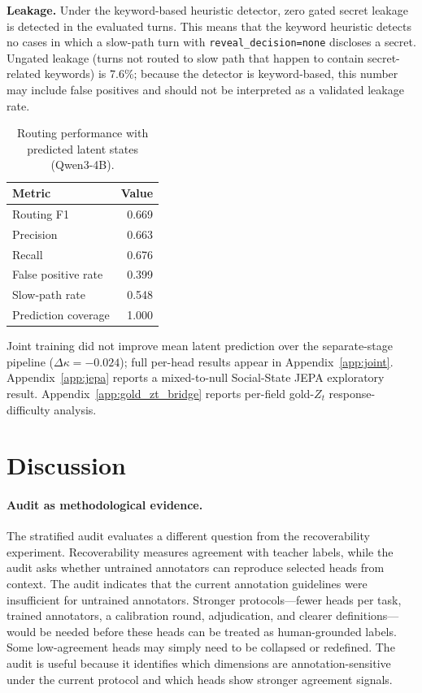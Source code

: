 \documentclass[11pt]{article}
\begin{document}
\textbf{Leakage.} Under the keyword-based heuristic detector, zero gated secret leakage is detected in the evaluated turns.
This means that the keyword heuristic detects no cases in which a slow-path turn with \texttt{reveal\_decision=none} discloses a secret.
Ungated leakage (turns not routed to slow path that happen to contain secret-related keywords) is 7.6\%; because the detector is keyword-based, this number may include false positives and should not be interpreted as a validated leakage rate.

\begin{table}[t]
\centering
\caption{Routing performance with predicted latent states (Qwen3-4B).}
\label{tab:routing}
\small
\begin{tabularx}{\linewidth}{@{}Xr@{}}
\toprule
\textbf{Metric} & \textbf{Value} \\
\midrule
Routing F1 & 0.669 \\
Precision & 0.663 \\
Recall & 0.676 \\
False positive rate & 0.399 \\
Slow-path rate & 0.548 \\
Prediction coverage & 1.000 \\
\bottomrule
\end{tabularx}
\end{table}

Joint training did not improve mean latent prediction over the separate-stage pipeline ($\Delta\kappa{=}-0.024$); full per-head results appear in Appendix~\ref{app:joint}.
Appendix~\ref{app:jepa} reports a mixed-to-null Social-State JEPA exploratory result.
Appendix~\ref{app:gold_zt_bridge} reports per-field gold-$Z_t$ response-difficulty analysis.

\section{Discussion}
\label{sec:discussion}

\paragraph{Audit as methodological evidence.}
The stratified audit evaluates a different question from the recoverability experiment.
Recoverability measures agreement with teacher labels, while the audit asks whether untrained annotators can reproduce selected heads from context.
The audit indicates that the current annotation guidelines were insufficient for untrained annotators.
Stronger protocols---fewer heads per task, trained annotators, a calibration round, adjudication, and clearer definitions---would be needed before these heads can be treated as human-grounded labels.
Some low-agreement heads may simply need to be collapsed or redefined.
The audit is useful because it identifies which dimensions are annotation-sensitive under the current protocol and which heads show stronger agreement signals.
\end{document}
